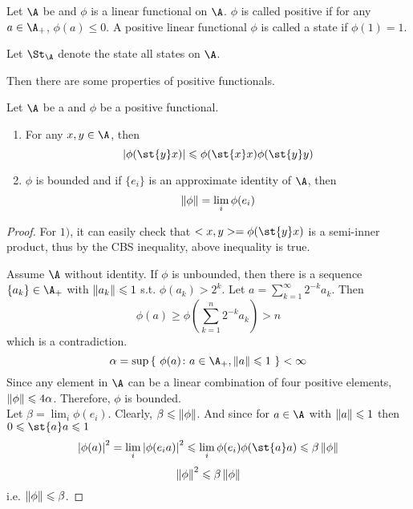 \begin{defn}
	Let $\A$ be \Cs and $\phi$ is a linear functional on $\A$. $\phi$ is called positive if for any $a \in \A_{+}$, $\phi(a) \leqslant 0$. A positive linear functional $\phi$ is called a state if $\phi(1) = 1$.
\end{defn}
\begin{rem}
	Let $\St_{\A}$ denote the state all states on $\A$.
\end{rem}

Then there are some properties of positive functionals.

\begin{prop}
	Let $\A$ be a \Cs and $\phi$ be a positive functional.
	\begin{enumerate}[label=\arabic*)]
		\item For any $x,y \in \A$, then
		\begin{equation*}
			\abs{\phi(\st{y}x)} \leqslant \phi(\st{x}x)\phi(\st{y}y)
		\end{equation*}
		\item $\phi$ is bounded and if $\{e_i\}$ is an approximate identity of $\A$, then
		\begin{equation*}
			\left\lVert\phi\right\lVert = \lim_{i} \phi(e_i)
		\end{equation*}
	\end{enumerate}
\end{prop}
\begin{proof}
	For $1)$, it can easily check that $<x,y> = \phi(\st{y}x)$ is a semi-inner product, thus by the CBS inequality, above inequality is true.
	\item Assume $\A$ without identity.  If $\phi$ is unbounded, then there is a sequence $\{a_k\} \in \A_{+}$ with $\left\lVert a_k\right\lVert \leqslant 1$ s.t. $\phi(a_k) > 2^k$. Let $a = \sum_{k=1}^{\infty} 2^{-k} a_k$. Then
	\begin{equation*}
		\phi(a) \geqslant \phi(\sum_{k=1}^{n} 2^{-k} a_k) > n
	\end{equation*}
	which is a contradiction.
	\begin{equation*}
		\alpha = \sup{\{~\phi(a) \colon a \in \A_{+}, \norm{a} \leqslant 1~\}} < \infty
	\end{equation*} 
	Since any element in $\A$ can be a linear combination of four positive elements, $\left\lVert\phi\right\lVert \leqslant 4\alpha$. Therefore, $\phi$ is bounded.\\
	Let $\beta = \lim_{i}\phi(e_i)$. Clearly, $\beta \leqslant \left\lVert\phi\right\lVert$. And since for $a \in \A$ with $\left\lVert a\right\lVert \leqslant 1$ then $0 \leqslant \st{a}a \leqslant 1$
	\begin{equation*}
		\abs{\phi(a)}^2 = \lim_{i} \abs{\phi(e_ia)}^2 \leqslant \lim_{i}\phi(e_i)\phi(\st{a}a) \leqslant \beta \norm{\phi}
	\end{equation*}	
	\begin{equation*}
		\left\lVert\phi\right\lVert^2 \leqslant \beta \left\lVert\phi\right\lVert
	\end{equation*}
	i.e. $\left\lVert\phi\right\lVert \leqslant \beta$.
\end{proof}
